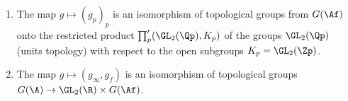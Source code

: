\begin{enumerate}[label=(\alph*)]
\item The map $g\mapsto(g_p)_p$ is an isomorphism of topological groups from $G(\Af)$ onto the restricted product
  $\prod'_p(\GL_2(\Qp),K_p)$ of the groups $\GL_2(\Qp)$ (units topology) with respect to the open subgroups
  $K_p=\GL_2(\Zp)$.
\item The map $g\mapsto(g_\infty,g_f)$ is an isomorphism of topological groups $G(\A)\to\GL_2(\R)\times G(\Af)$.
\end{enumerate}
